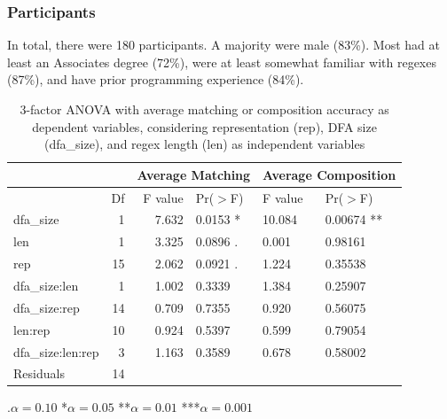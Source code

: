 \subsubsection{Participants}

In total, there were 180 participants.
A majority were male (83\%). %
Most had
at least an Associates degree (72\%), were at least somewhat familiar with regexes (87\%), and have prior programming experience (84\%).





\begin{table}[t]
\centering
\caption{3-factor ANOVA  with average matching or composition accuracy as  dependent variables, considering representation (rep), DFA size (dfa\_size), and regex length (len) as independent variables}
\begin{tabular}{@{}l@{}r|rl|ll@{}}

  \multicolumn{2}{c}{} & \multicolumn{2}{c}{Average Matching} & \multicolumn{2}{c}{Average Composition} \\
    \hline
 & Df & F value & Pr($>$F) & F value & Pr($>$F) \\
  \hline
dfa\_size &              1 &  7.632 &0.0153 * & 10.084 &0.00674 ** \\
len      &          1 &  3.325 &0.0896 . &  0.001 &0.98161 \\
rep            &      15 &  2.062 &0.0921 . & 1.224 &0.35538\\
dfa\_size:len  &     1 & 1.002 &0.3339  & 1.384 &0.25907   \\
dfa\_size:rep    &     14 & 0.709 &0.7355 &0.920& 0.56075   \\
len:rep     &     10 & 0.924& 0.5397  &  0.599& 0.79054   \\
dfa\_size:len:rep  &3&  1.163& 0.3589 & 0.678 &0.58002   \\
Residuals        &     14&&&&\\
   \hline
\end{tabular}

\vspace{3pt}
.$\alpha = 0.10$ \hspace{3pt} *$\alpha=0.05$ \hspace{3pt} **$\alpha=0.01$ \hspace{3pt} ***$\alpha=0.001$
\label{table:anova}
\end{table}

